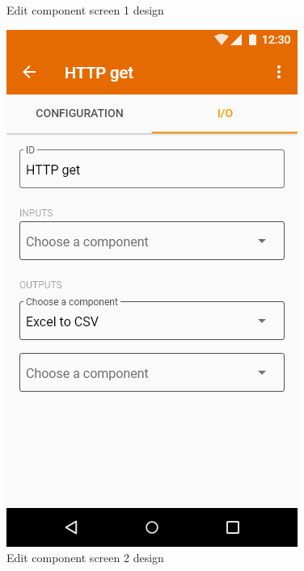 \begin{figure}
\begin{minipage}[b]{0.32\textwidth}
    	\caption[Edit component screen 1]{Edit component screen 1 design}\label{fig:xdEditComponent1}
    \end{minipage}
    \begin{minipage}[b]{0.32\textwidth}
    	\includegraphics[width=\textwidth]{pics/xd/Edit component - io.png}
    	\caption[Edit component screen 2]{Edit component screen 2 design}\label{fig:xdEditComponent2}
    \end{minipage}
\end{figure}

